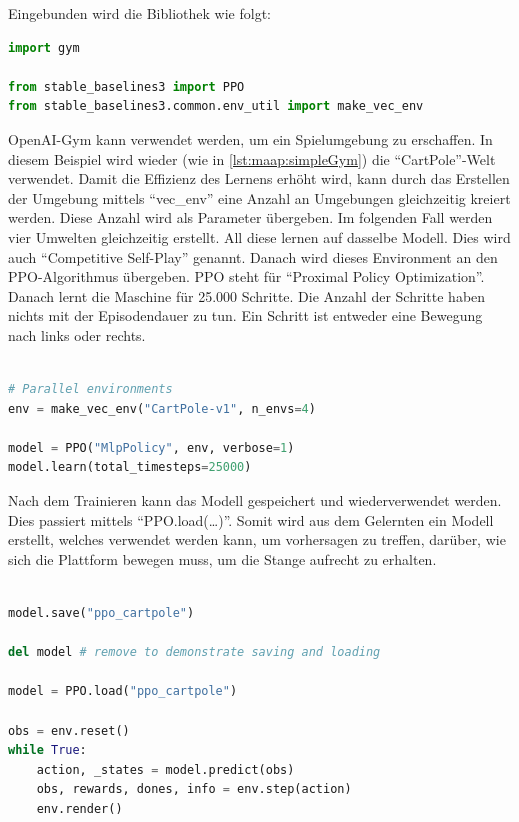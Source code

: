 Eingebunden wird die Bibliothek wie folgt:
\begin{lstlisting}[language=Python,label=lst:maap:pposampleone,caption=Stable-Baselines3 Beispiel]
import gym

from stable_baselines3 import PPO
from stable_baselines3.common.env_util import make_vec_env

\end{lstlisting}

OpenAI-Gym kann verwendet werden, um ein Spielumgebung zu erschaffen. In diesem Beispiel wird wieder (wie in \ref{lst:maap:simpleGym}) die ``CartPole''-Welt verwendet. Damit die Effizienz des Lernens erhöht wird, kann durch das Erstellen der Umgebung mittels ``vec\_env'' eine Anzahl an Umgebungen gleichzeitig kreiert werden. Diese Anzahl wird als Parameter übergeben. Im folgenden Fall werden vier Umwelten gleichzeitig erstellt. All diese lernen auf dasselbe Modell. Dies wird auch ``Competitive Self-Play'' genannt. Danach wird dieses Environment an den PPO-Algorithmus übergeben. PPO steht für ``Proximal Policy Optimization''. Danach lernt die Maschine für 25.000 Schritte. Die Anzahl der Schritte haben nichts mit der Episodendauer zu tun. Ein Schritt ist entweder eine Bewegung nach links oder rechts. \cite{ppo}


\begin{lstlisting}[language=Python,firstnumber=6]

# Parallel environments
env = make_vec_env("CartPole-v1", n_envs=4)

model = PPO("MlpPolicy", env, verbose=1)
model.learn(total_timesteps=25000)
\end{lstlisting}

Nach dem Trainieren kann das Modell gespeichert und wiederverwendet werden. Dies passiert mittels ``PPO.load(\dots)''. Somit wird aus dem Gelernten ein Modell erstellt, welches verwendet werden kann, um vorhersagen zu treffen, darüber, wie sich die Plattform bewegen muss, um die Stange aufrecht zu erhalten.

\begin{lstlisting}[language=Python,firstnumber=12]

model.save("ppo_cartpole")

del model # remove to demonstrate saving and loading

model = PPO.load("ppo_cartpole")

obs = env.reset()
while True:
    action, _states = model.predict(obs)
    obs, rewards, dones, info = env.step(action)
    env.render()
\end{lstlisting}

